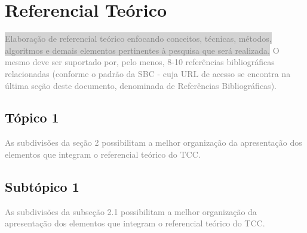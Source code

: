 \section{Referencial Teórico}
\textcolor{gray}{\colorbox{lightgray}{Elaboração de referencial teórico enfocando conceitos, técnicas, métodos, algoritmos e }
\colorbox{lightgray}{demais elementos pertinentes à pesquisa que será realizada.} O mesmo deve ser suportado por, pelo menos, 8-10 referências bibliográficas relacionadas (conforme o padrão da SBC - cuja URL de acesso se encontra na última seção deste documento, denominada de Referências Bibliográficas).}

\subsection{Tópico 1}
\textcolor{gray}{As subdivisões da seção 2 possibilitam a melhor organização da apresentação dos elementos que integram o referencial teórico do TCC.}

\subsection{Subtópico 1}

\textcolor{gray}{As subdivisões da subseção 2.1 possibilitam a melhor organização da apresentação dos elementos que integram o referencial teórico do TCC.}
